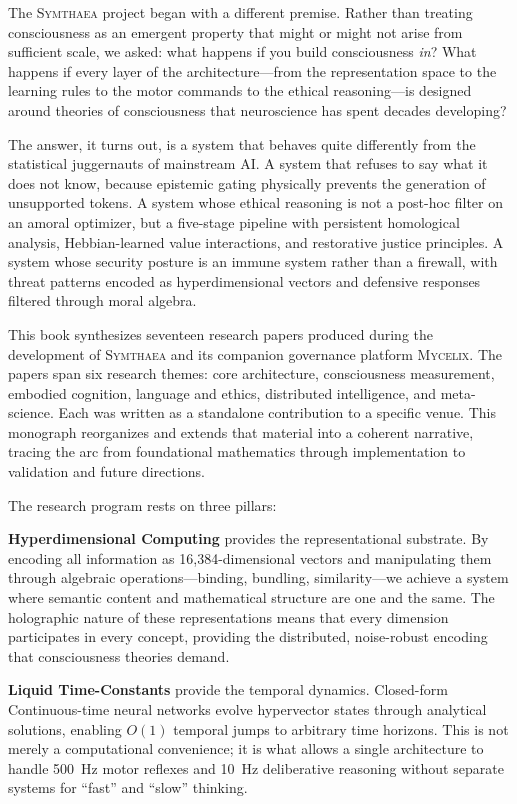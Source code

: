 \documentclass[12pt]{book}
\newcommand{\symthaea}{\textsc{Symthaea}}
\newcommand{\mycelix}{\textsc{Mycelix}}
\begin{document}
The \symthaea{} project began with a different premise. Rather than treating consciousness as an emergent property that might or might not arise from sufficient scale, we asked: what happens if you build consciousness \textit{in}? What happens if every layer of the architecture---from the representation space to the learning rules to the motor commands to the ethical reasoning---is designed around theories of consciousness that neuroscience has spent decades developing?

The answer, it turns out, is a system that behaves quite differently from the statistical juggernauts of mainstream AI. A system that refuses to say what it does not know, because epistemic gating physically prevents the generation of unsupported tokens. A system whose ethical reasoning is not a post-hoc filter on an amoral optimizer, but a five-stage pipeline with persistent homological analysis, Hebbian-learned value interactions, and restorative justice principles. A system whose security posture is an immune system rather than a firewall, with threat patterns encoded as hyperdimensional vectors and defensive responses filtered through moral algebra.

This book synthesizes seventeen research papers produced during the development of \symthaea{} and its companion governance platform \mycelix{}. The papers span six research themes: core architecture, consciousness measurement, embodied cognition, language and ethics, distributed intelligence, and meta-science. Each was written as a standalone contribution to a specific venue. This monograph reorganizes and extends that material into a coherent narrative, tracing the arc from foundational mathematics through implementation to validation and future directions.

The research program rests on three pillars:

\textbf{Hyperdimensional Computing} provides the representational substrate. By encoding all information as 16,384-dimensional vectors and manipulating them through algebraic operations---binding, bundling, similarity---we achieve a system where semantic content and mathematical structure are one and the same. The holographic nature of these representations means that every dimension participates in every concept, providing the distributed, noise-robust encoding that consciousness theories demand.

\textbf{Liquid Time-Constants} provide the temporal dynamics. Closed-form Continuous-time neural networks evolve hypervector states through analytical solutions, enabling $O(1)$ temporal jumps to arbitrary time horizons. This is not merely a computational convenience; it is what allows a single architecture to handle 500~Hz motor reflexes and 10~Hz deliberative reasoning without separate systems for ``fast'' and ``slow'' thinking.
\end{document}
